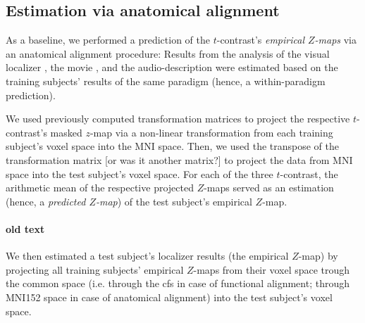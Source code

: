 



\subsection{Estimation via anatomical alignment}



%
As a baseline, we performed a prediction of the $t$-contrast's \textit{empirical
$Z$-maps} via an anatomical alignment procedure:
%
Results from the analysis of
%
the visual localizer \citep{sengupta2016extension},
%
the movie \citep{haeusler2022processing}, and
%
the audio-description \citep{haeusler2022processing}
%
were estimated based on the training subjects' results of the same paradigm
(hence, a within-paradigm prediction).

We used previously computed transformation matrices
\citep[][\href{https://github.com/psychoinformatics-de/studyforrest-data-templatetransforms}{\url{github.com/psychoinformatics-de/studyforrest-data-templatetransforms}}]{hanke2014audiomovie}
to project the respective $t$-contrast's masked $z$-map via a non-linear
transformation from each training subject's voxel space into the MNI space.
Then, we  used the transpose of the transformation matrix [or was it another
matrix?] to project the data from MNI space into the test subject's voxel space.
For each of the three $t$-contrast, the arithmetic mean of the respective
projected $Z$-maps served as an estimation (hence, a \textit{predicted $Z$-map})
of the test subject's empirical $Z$-map.


\paragraph{old text}

We then estimated a test subject's localizer results (the empirical $Z$-map) by
projecting all training subjects' empirical $Z$-maps from their voxel space
trough the common space (i.e. through the \ac{cfs} in case of functional
alignment; through MNI152 space in case of anatomical alignment) into the test
subject's voxel space.



